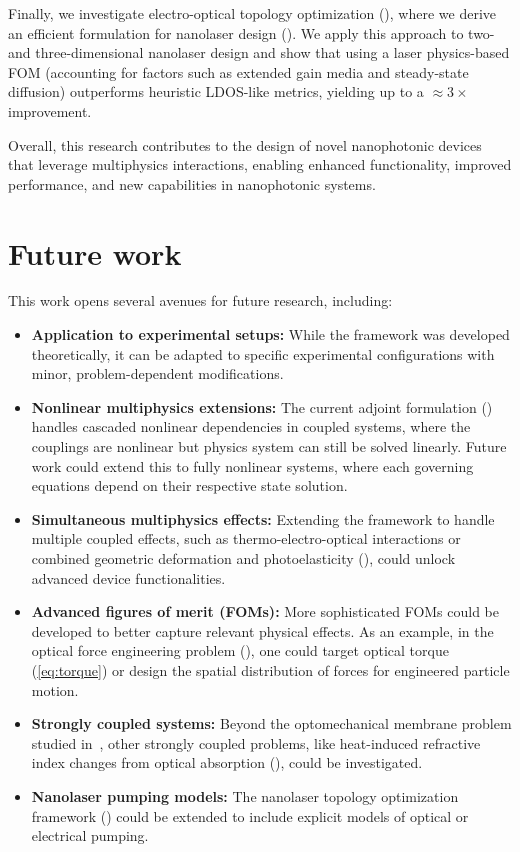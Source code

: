 Finally, we investigate electro-optical topology optimization (), where we derive an efficient formulation for nanolaser design
(). We apply this approach to two- and three-dimensional nanolaser design and show that using
 a laser physics-based FOM (accounting for factors such as extended gain media and steady-state diffusion) outperforms
  heuristic LDOS-like metrics, yielding up to a $\approx 3\times$ improvement.

Overall, this research contributes to the design of novel nanophotonic devices that leverage multiphysics interactions, enabling enhanced functionality, improved performance, and new capabilities in nanophotonic systems.

\section{Future work}

This work opens several avenues for future research, including:

\begin{itemize}
    \item \textbf{Application to experimental setups:} While the framework was developed theoretically, it can be adapted to specific experimental configurations with minor, problem-dependent modifications.
    
    \item \textbf{Nonlinear multiphysics extensions:} The current adjoint formulation () handles cascaded nonlinear dependencies in coupled systems, where the couplings are nonlinear but physics system can still be solved linearly. Future work could extend this to fully nonlinear systems, where each governing equations depend on their respective state solution.
    
    \item \textbf{Simultaneous multiphysics effects:} Extending the framework to handle multiple coupled effects, such as thermo-electro-optical interactions or combined geometric deformation and photoelasticity (), could unlock advanced device functionalities.
    
    \item \textbf{Advanced figures of merit (FOMs):} More sophisticated FOMs could be developed to better capture relevant physical effects. As an example, in the optical force engineering problem (), one could target optical torque (\eqref{eq:torque}) or design the spatial distribution of forces for engineered particle motion.
    
    \item \textbf{Strongly coupled systems:} Beyond the optomechanical membrane problem studied in~, other strongly coupled problems, like heat-induced refractive index changes from optical absorption (), could be investigated.
    
    \item \textbf{Nanolaser pumping models:} The nanolaser topology optimization framework () could be extended to include explicit models of optical or electrical pumping.
\end{itemize}